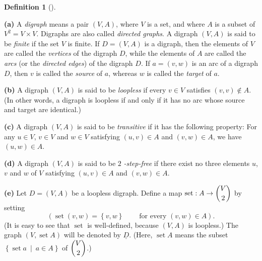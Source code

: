 \documentclass[numbers=enddot,12pt,final,onecolumn,notitlepage]{scrartcl}%
\theoremstyle{definition}
\newtheorem{defi}[theo]{Definition}
\newenvironment{definition}[1][]
{\begin{defi}[#1]\begin{leftbar}}
{\end{leftbar}\end{defi}}
\begin{document}
\begin{definition}
\label{def.digraph}\textbf{(a)} A \emph{digraph} means a pair $\left(
V,A\right)  $, where $V$ is a set, and where $A$ is a subset of $V^{2}=V\times
V$. Digraphs are also called \emph{directed graphs}. A digraph $\left(
V,A\right)  $ is said to be \emph{finite} if the set $V$ is finite. If
$D=\left(  V,A\right)  $ is a digraph, then the elements of $V$ are called the
\emph{vertices} of the digraph $D$, while the elements of $A$ are called the
\emph{arcs} (or the \emph{directed edges}) of the digraph $D$. If $a=\left(
v,w\right)  $ is an arc of a digraph $D$, then $v$ is called the \emph{source}
of $a$, whereas $w$ is called the \emph{target} of $a$.

\textbf{(b)} A digraph $\left(  V,A\right)  $ is said to be \emph{loopless} if
every $v\in V$ satisfies $\left(  v,v\right)  \notin A$. (In other words, a
digraph is loopless if and only if it has no arc whose source and target are identical.)

\textbf{(c)} A digraph $\left(  V,A\right)  $ is said to be \emph{transitive}
if it has the following property: For any $u\in V$, $v\in V$ and $w\in V$
satisfying $\left(  u,v\right)  \in A$ and $\left(  v,w\right)  \in A$, we
have $\left(  u,w\right)  \in A$.

\textbf{(d)} A digraph $\left(  V,A\right)  $ is said to be $2$%
\emph{-step-free} if there exist no three elements $u$, $v$ and $w$ of $V$
satisfying $\left(  u,v\right)  \in A$ and $\left(  v,w\right)  \in A$.

\textbf{(e)} Let $D=\left(  V,A\right)  $ be a loopless digraph. Define a map
$\operatorname*{set}:A\rightarrow\dbinom{V}{2}$ by setting%
\[
\left(  \operatorname*{set}\left(  v,w\right)  =\left\{  v,w\right\}
\ \ \ \ \ \ \ \ \ \ \text{for every }\left(  v,w\right)  \in A\right)  .
\]
(It is easy to see that $\operatorname*{set}$ is well-defined, because
$\left(  V,A\right)  $ is loopless.) The graph $\left(  V,\operatorname*{set}%
A\right)  $ will be denoted by $\underline{D}$. (Here, $\operatorname*{set}A$
means the subset $\left\{  \operatorname*{set}a\ \mid\ a\in A\right\}  $ of
$\dbinom{V}{2}$.)
\end{definition}
\end{document}
